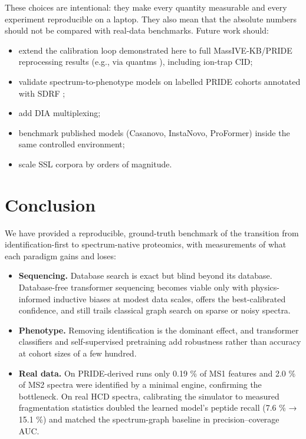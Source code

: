 \documentclass{sn-preview}
\begin{document}
These choices are intentional: they make every quantity measurable and every experiment reproducible on a laptop. They also mean that the absolute numbers should not be compared with real-data benchmarks. Future work should:

\begin{itemize}
\item
  extend the calibration loop demonstrated here to full MassIVE-KB/PRIDE reprocessing results (e.g., via quantms \cite{dai2024}), including ion-trap CID;
\item
  validate spectrum-to-phenotype models on labelled PRIDE cohorts annotated with SDRF \cite{dai2021};
\item
  add DIA multiplexing;
\item
  benchmark published models (Casanovo, InstaNovo, ProFormer) inside the same controlled environment;
\item
  scale SSL corpora by orders of magnitude.
\end{itemize}

\section{Conclusion}\label{sec:conclusion}
We have provided a reproducible, ground-truth benchmark of the transition from identification-first to spectrum-native proteomics, with measurements of what each paradigm gains and loses:

\begin{itemize}
\item
  \textbf{Sequencing.} Database search is exact but blind beyond its database. Database-free transformer sequencing becomes viable only with physics-informed inductive biases at modest data scales, offers the best-calibrated confidence, and still trails classical graph search on sparse or noisy spectra.
\item
  \textbf{Phenotype.} Removing identification is the dominant effect, and transformer classifiers and self-supervised pretraining add robustness rather than accuracy at cohort sizes of a few hundred.
\item
  \textbf{Real data.} On PRIDE-derived runs only 0.19 \% of MS1 features and 2.0 \% of MS2 spectra were identified by a minimal engine, confirming the bottleneck. On real HCD spectra, calibrating the simulator to measured fragmentation statistics doubled the learned model's peptide recall (7.6 \% → 15.1 \%) and matched the spectrum-graph baseline in precision--coverage AUC.
\end{itemize}
\end{document}
